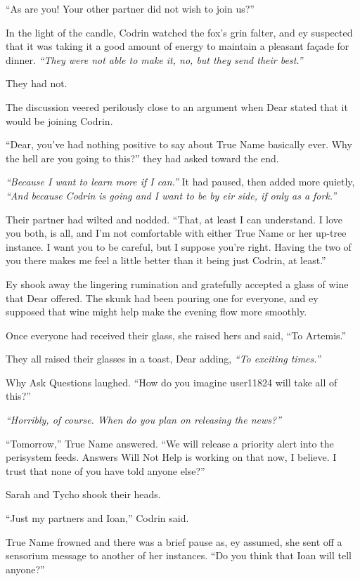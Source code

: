 ``As are you! Your other partner did not wish to join us?''

In the light of the candle, Codrin watched the fox's grin falter, and ey suspected that it was taking it a good amount of energy to maintain a pleasant façade for dinner. \emph{``They were not able to make it, no, but they send their best.''}

They had not.

The discussion veered perilously close to an argument when Dear stated that it would be joining Codrin.

``Dear, you've had nothing positive to say about True Name basically ever. Why the hell are you going to this?'' they had asked toward the end.

\emph{``Because I want to learn more if I can.''} It had paused, then added more quietly, \emph{``And because Codrin is going and I want to be by eir side, if only as a fork.''}

Their partner had wilted and nodded. ``That, at least I can understand. I love you both, is all, and I'm not comfortable with either True Name or her up-tree instance. I want you to be careful, but I suppose you're right. Having the two of you there makes me feel a little better than it being just Codrin, at least.''

Ey shook away the lingering rumination and gratefully accepted a glass of wine that Dear offered. The skunk had been pouring one for everyone, and ey supposed that wine might help make the evening flow more smoothly.

Once everyone had received their glass, she raised hers and said, ``To Artemis.''

They all raised their glasses in a toast, Dear adding, \emph{``To exciting times.''}

Why Ask Questions laughed. ``How do you imagine user11824 will take all of this?''

\emph{``Horribly, of course. When do you plan on releasing the news?''}

``Tomorrow,'' True Name answered. ``We will release a priority alert into the perisystem feeds. Answers Will Not Help is working on that now, I believe. I trust that none of you have told anyone else?''

Sarah and Tycho shook their heads.

``Just my partners and Ioan,'' Codrin said.

True Name frowned and there was a brief pause as, ey assumed, she sent off a sensorium message to another of her instances. ``Do you think that Ioan will tell anyone?''


